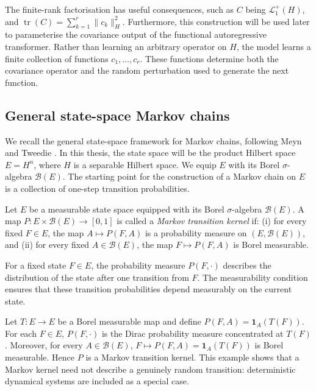 The finite-rank factorisation has useful consequences, such as \(C\) being \(\mathcal L_1^+(H)\), and \(\operatorname{tr}(C)=\sum_{k=1}^r\|c_k\|_H^2\). Furthermore, this construction will be used later to parameterise the covariance output of the functional autoregressive transformer. Rather than learning an arbitrary operator on \(H\), the model learns a finite collection of functions \(c_1,\ldots,c_r\). These functions determine both the covariance operator and the random perturbation used to generate the next function.


\subsection{General state-space Markov chains}\label{subsec:General state-space Markov chains}

We recall the general state-space framework for Markov chains, following Meyn and Tweedie \cite{MeynTweedie2009}. In this thesis, the state space will be the product Hilbert space \(E=H^n\), where \(H\) is a separable Hilbert space. We equip \(E\) with its Borel \(\sigma\)-algebra \(\mathcal B(E)\).
The starting point for the construction of a Markov chain on \(E\) is a collection of one-step transition probabilities.

\begin{definition}\label{def:Markov transition kernel}
Let \(E\) be a measurable state space equipped with its Borel \(\sigma\)-algebra \(\mathcal B(E)\). A map \(P:E\times\mathcal B(E)\to[0,1]\) is called a \emph{Markov transition kernel} if: (i) for every fixed \(F\in E\), the map \(A\mapsto P(F,A)\) is a probability measure on \((E,\mathcal B(E))\), and (ii) for every fixed \(A\in\mathcal B(E)\), the map \(F\mapsto P(F,A)\) is Borel measurable.
\end{definition}
For a fixed state \(F\in E\), the probability measure \(P(F,\cdot)\) describes the distribution of the state after one transition from \(F\). The measurability condition ensures that these transition probabilities depend measurably on the current state.

\begin{example}
Let \(T:E\to E\) be a Borel measurable map and define \(P(F,A)=\mathbf 1_A(T(F))\). For each \(F\in E\), \(P(F,\cdot)\) is the Dirac probability measure concentrated at \(T(F)\). Moreover, for every \(A\in\mathcal B(E)\), \(F\mapsto P(F,A)=\mathbf 1_A(T(F))\) is Borel measurable. Hence \(P\) is a Markov transition kernel. This example shows that a Markov kernel need not describe a genuinely random transition: deterministic dynamical systems are included as a special case.
\end{example}

